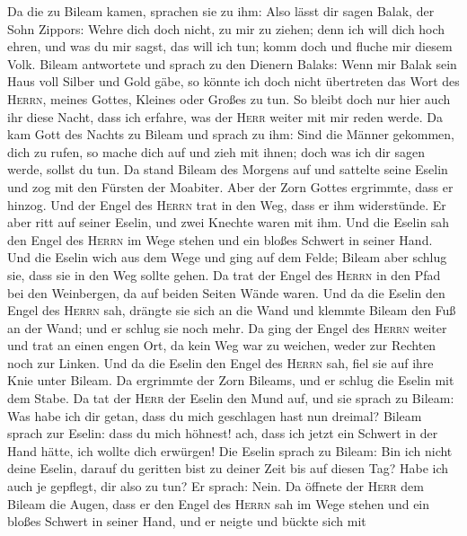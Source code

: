 Da die zu Bileam kamen, sprachen sie zu ihm: Also lässt dir sagen Balak,
der Sohn Zippors: Wehre dich doch nicht, zu mir zu ziehen;
 denn ich will dich hoch ehren, und was du mir sagst, das
will ich tun; komm doch und fluche mir diesem Volk. 
Bileam antwortete und sprach zu den Dienern Balaks: Wenn mir Balak sein
Haus voll Silber und Gold gäbe, so könnte ich doch nicht übertreten das
Wort des \textsc{Herrn}, meines Gottes, Kleines oder Großes zu tun.
 So bleibt doch nur hier auch ihr diese Nacht, dass ich
erfahre, was der \textsc{Herr} weiter mit mir reden werde.
 Da kam Gott des Nachts zu Bileam und sprach zu ihm: Sind
die Männer gekommen, dich zu rufen, so mache dich auf und zieh mit
ihnen; doch was ich dir sagen werde, sollst du tun.  Da
stand Bileam des Morgens auf und sattelte seine Eselin und zog mit den
Fürsten der Moabiter.  Aber der Zorn Gottes ergrimmte,
dass er hinzog. Und der Engel des \textsc{Herrn} trat in den Weg, dass
er ihm widerstünde. Er aber ritt auf seiner Eselin, und zwei Knechte
waren mit ihm.  Und die Eselin sah den Engel des
\textsc{Herrn} im Wege stehen und ein bloßes Schwert in seiner Hand. Und
die Eselin wich aus dem Wege und ging auf dem Felde; Bileam aber schlug
sie, dass sie in den Weg sollte gehen.  Da trat der Engel
des \textsc{Herrn} in den Pfad bei den Weinbergen, da auf beiden Seiten
Wände waren.  Und da die Eselin den Engel des
\textsc{Herrn} sah, drängte sie sich an die Wand und klemmte Bileam den
Fuß an der Wand; und er schlug sie noch mehr.  Da ging
der Engel des \textsc{Herrn} weiter und trat an einen engen Ort, da kein
Weg war zu weichen, weder zur Rechten noch zur Linken. 
Und da die Eselin den Engel des \textsc{Herrn} sah, fiel sie auf ihre
Knie unter Bileam. Da ergrimmte der Zorn Bileams, und er schlug die
Eselin mit dem Stabe.  Da tat der \textsc{Herr} der
Eselin den Mund auf, und sie sprach zu Bileam: Was habe ich dir getan,
dass du mich geschlagen hast nun dreimal?  Bileam sprach
zur Eselin: dass du mich höhnest! ach, dass ich jetzt ein Schwert in der
Hand hätte, ich wollte dich erwürgen!  Die Eselin sprach
zu Bileam: Bin ich nicht deine Eselin, darauf du geritten bist zu deiner
Zeit bis auf diesen Tag? Habe ich auch je gepflegt, dir also zu tun? Er
sprach: Nein.  Da öffnete der \textsc{Herr} dem Bileam
die Augen, dass er den Engel des \textsc{Herrn} sah im Wege stehen und
ein bloßes Schwert in seiner Hand, und er neigte und bückte sich mit
